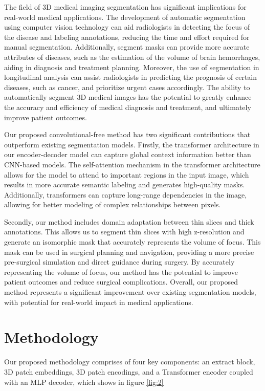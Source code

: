 \documentclass{article}
\begin{document}
The field of 3D medical imaging segmentation has significant implications for real-world medical applications. The development of automatic segmentation using computer vision technology \cite{zhang2024motionavatar} can aid radiologists in detecting the focus of the disease and labeling annotations, reducing the time and effort required for manual segmentation. Additionally, segment masks can provide more accurate attributes of diseases, such as the estimation of the volume of brain hemorrhages, aiding in diagnosis and treatment planning. Moreover, the use of segmentation in longitudinal analysis can assist radiologists in predicting the prognosis of certain diseases, such as cancer, and prioritize urgent cases accordingly. The ability to automatically segment 3D medical images has the potential to greatly enhance the accuracy and efficiency of medical diagnosis and treatment, and ultimately improve patient outcomes.

Our proposed convolutional-free method has two significant contributions that outperform existing segmentation models. Firstly, the transformer architecture in our encoder-decoder model can capture global context information better than CNN-based models. The self-attention mechanism in the transformer architecture allows for the model to attend to important regions in the input image, which results in more accurate semantic labeling and generates high-quality masks. Additionally, transformers can capture long-range dependencies in the image, allowing for better modeling of complex relationships between pixels.

Secondly, our method includes domain adaptation between thin slices and thick annotations. This allows us to segment thin slices with high z-resolution and generate an isomorphic mask that accurately represents the volume of focus. This mask can be used in surgical planning and navigation, providing a more precise pre-surgical simulation and direct guidance during surgery. By accurately representing the volume of focus, our method has the potential to improve patient outcomes and reduce surgical complications. Overall, our proposed method represents a significant improvement over existing segmentation models, with potential for real-world impact in medical applications.

\section{Methodology}

Our proposed methodology comprises of four key components: an extract block, 3D patch embeddings, 3D patch encodings, and a Transformer encoder coupled with an MLP decoder, which shows in figure \ref{fig:2}
\end{document}
